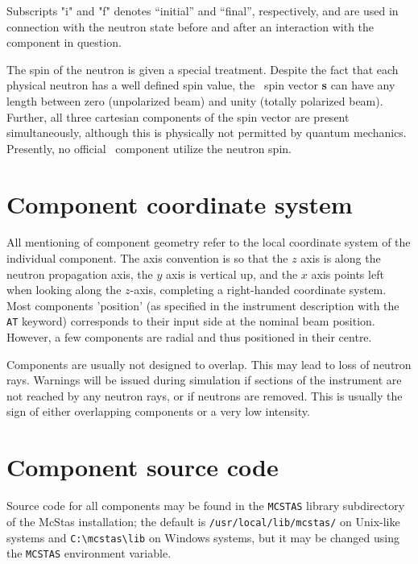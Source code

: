 Subscripts "i" and "f" denotes ``initial'' and ``final'', respectively,
and are used in connection with the neutron state before and after
an interaction with the component in question.

The spin of the neutron is given a special treatment. Despite
the fact that each physical neutron has a well defined spin value, 
the \MCS\ spin vector
{\bf s} can have any length between zero (unpolarized beam) and unity
(totally polarized beam). Further, all three cartesian components of
the spin vector are present simultaneously, although this is physically
not permitted by quantum mechanics.
Presently, no official \MCS\ component utilize the neutron spin. 

\section{Component coordinate system}
All mentioning of component geometry refer to
the local coordinate system of the individual component.
The axis convention is so that the $z$ axis is along
the neutron propagation axis, the $y$ axis is vertical up,
and the $x$ axis points left when looking along the $z$-axis,
completing a right-handed coordinate system.
Most components 'position' (as specified in the instrument description
with the \verb+AT+ keyword) corresponds to their input side at the nominal
beam position.
However, a few components are radial and thus positioned in their centre.

Components are usually not designed to overlap.
This may lead to loss of neutron rays.
Warnings will be issued during simulation if sections of the instrument
are not reached by any neutron rays, or if neutrons are removed.
This is usually the sign of either overlapping components
or a very low intensity.

\section{Component source code}
Source code for all components may be found in the \verb+MCSTAS+ library
subdirectory of the McStas installation;
the default is \verb+/usr/local/lib/mcstas/+
on Unix-like systems and \verb+C:\mcstas\lib+ on Windows systems, but it may be
changed using the \verb+MCSTAS+ environment variable.

